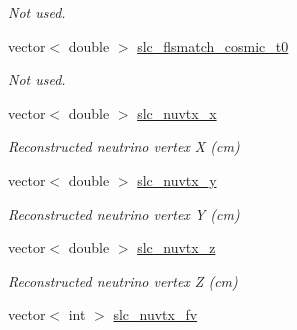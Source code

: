 \begin{DoxyCompactItemize}
\begin{DoxyCompactList}\small\item\em Not used. \end{DoxyCompactList}\item 
\hypertarget{classUBXSecEvent_a645973d4e447d46008828658b826e8f0}{vector$<$ double $>$ \hyperlink{classUBXSecEvent_a645973d4e447d46008828658b826e8f0}{slc\-\_\-flsmatch\-\_\-cosmic\-\_\-t0}}\label{classUBXSecEvent_a645973d4e447d46008828658b826e8f0}

\begin{DoxyCompactList}\small\item\em Not used. \end{DoxyCompactList}\item 
\hypertarget{classUBXSecEvent_ac97e86f7559ceb52bacb97bd60c25f09}{vector$<$ double $>$ \hyperlink{classUBXSecEvent_ac97e86f7559ceb52bacb97bd60c25f09}{slc\-\_\-nuvtx\-\_\-x}}\label{classUBXSecEvent_ac97e86f7559ceb52bacb97bd60c25f09}

\begin{DoxyCompactList}\small\item\em Reconstructed neutrino vertex X (cm) \end{DoxyCompactList}\item 
\hypertarget{classUBXSecEvent_aabba0cbb738793a9713deb8888d3919b}{vector$<$ double $>$ \hyperlink{classUBXSecEvent_aabba0cbb738793a9713deb8888d3919b}{slc\-\_\-nuvtx\-\_\-y}}\label{classUBXSecEvent_aabba0cbb738793a9713deb8888d3919b}

\begin{DoxyCompactList}\small\item\em Reconstructed neutrino vertex Y (cm) \end{DoxyCompactList}\item 
\hypertarget{classUBXSecEvent_abc7e1a40fd182e817c83e5e4066eeb07}{vector$<$ double $>$ \hyperlink{classUBXSecEvent_abc7e1a40fd182e817c83e5e4066eeb07}{slc\-\_\-nuvtx\-\_\-z}}\label{classUBXSecEvent_abc7e1a40fd182e817c83e5e4066eeb07}

\begin{DoxyCompactList}\small\item\em Reconstructed neutrino vertex Z (cm) \end{DoxyCompactList}\item 
\hypertarget{classUBXSecEvent_ae5160345d6d863bbe3ad2abb19298dc6}{vector$<$ int $>$ \hyperlink{classUBXSecEvent_ae5160345d6d863bbe3ad2abb19298dc6}{slc\-\_\-nuvtx\-\_\-fv}}\label{classUBXSecEvent_ae5160345d6d863bbe3ad2abb19298dc6}


\end{DoxyCompactItemize}
